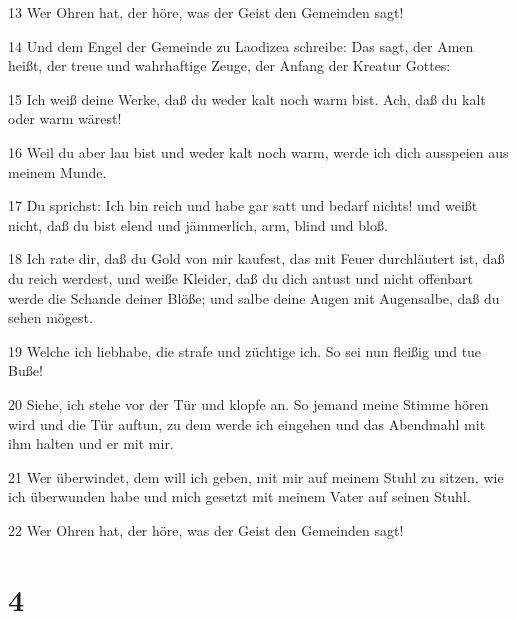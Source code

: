 \par 13 Wer Ohren hat, der höre, was der Geist den Gemeinden sagt!
\par 14 Und dem Engel der Gemeinde zu Laodizea schreibe: Das sagt, der Amen heißt, der treue und wahrhaftige Zeuge, der Anfang der Kreatur Gottes:
\par 15 Ich weiß deine Werke, daß du weder kalt noch warm bist. Ach, daß du kalt oder warm wärest!
\par 16 Weil du aber lau bist und weder kalt noch warm, werde ich dich ausspeien aus meinem Munde.
\par 17 Du sprichst: Ich bin reich und habe gar satt und bedarf nichts! und weißt nicht, daß du bist elend und jämmerlich, arm, blind und bloß.
\par 18 Ich rate dir, daß du Gold von mir kaufest, das mit Feuer durchläutert ist, daß du reich werdest, und weiße Kleider, daß du dich antust und nicht offenbart werde die Schande deiner Blöße; und salbe deine Augen mit Augensalbe, daß du sehen mögest.
\par 19 Welche ich liebhabe, die strafe und züchtige ich. So sei nun fleißig und tue Buße!
\par 20 Siehe, ich stehe vor der Tür und klopfe an. So jemand meine Stimme hören wird und die Tür auftun, zu dem werde ich eingehen und das Abendmahl mit ihm halten und er mit mir.
\par 21 Wer überwindet, dem will ich geben, mit mir auf meinem Stuhl zu sitzen, wie ich überwunden habe und mich gesetzt mit meinem Vater auf seinen Stuhl.
\par 22 Wer Ohren hat, der höre, was der Geist den Gemeinden sagt!

\chapter{4}

